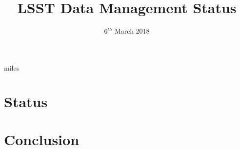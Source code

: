 


\title{LSST Data Management Status  }
\date{ 6$^{th}$ March 2018}


\graphicspath{{./figures} {./images/}{../../dm-docs/images/} }





\maketitle

 {miles}


\section{Status }








\section{Conclusion}


\appendix



